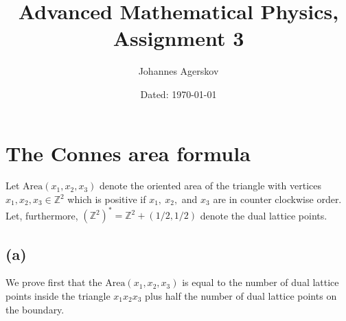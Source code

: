 \documentclass[a4paper,11pt]{article}
\author{Johannes Agerskov}
\date{Dated: \today}
\title{Advanced Mathematical Physics, Assignment 3}
\newcommand{\Z}{\mathbb{Z}}
\newcommand{\Area}{\text{Area}}
\numberwithin{equation}{section}
\begin{document}
	\maketitle

\section{The Connes area formula}
Let $ \text{Area}(x_1,x_2,x_3) $ denote the oriented area of the triangle with vertices $ x_1,x_2,x_3\in\Z^2 $ which is positive if $ x_1,\ x_2, $ and $ x_3 $ are in counter clockwise order. Let, furthermore, $ (\Z^2)^*=\Z^2+(1/2,1/2) $ denote the dual lattice points.
\subsection*{(a)}
We prove first that the $ \Area(x_1,x_2,x_3) $ is equal to the number of dual lattice points inside the triangle $ x_1x_2x_3 $ plus half the number of dual lattice points on the boundary.
\end{document}
